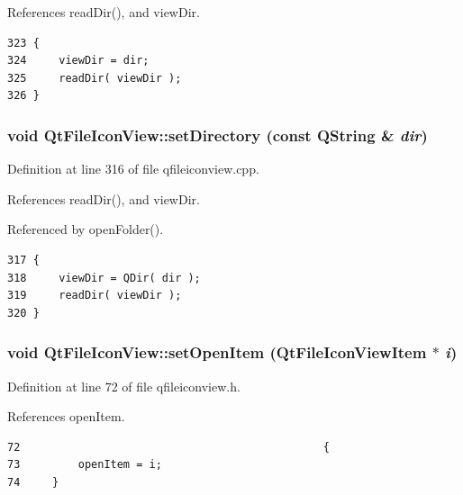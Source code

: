 References read\-Dir(), and view\-Dir.



\footnotesize\begin{verbatim}323 {
324     viewDir = dir;
325     readDir( viewDir );
326 }
\end{verbatim}\normalsize 
{}
\subsubsection{\setlength{\rightskip}{0pt plus 5cm}void Qt\-File\-Icon\-View::set\-Directory (const QString \& {\em dir})\hspace{0.3cm}{\tt  [slot]}}\label{classQtFileIconView_QtFileIconViewi0}




Definition at line 316 of file qfileiconview.cpp.

References read\-Dir(), and view\-Dir.

Referenced by open\-Folder().



\footnotesize\begin{verbatim}317 {
318     viewDir = QDir( dir );
319     readDir( viewDir );
320 }
\end{verbatim}\normalsize 
{}
\subsubsection{\setlength{\rightskip}{0pt plus 5cm}void Qt\-File\-Icon\-View::set\-Open\-Item ({\bf Qt\-File\-Icon\-View\-Item} $\ast$ {\em i})\hspace{0.3cm}{\tt  [inline]}}\label{classQtFileIconView_QtFileIconViewa3}




Definition at line 72 of file qfileiconview.h.

References open\-Item.



\footnotesize\begin{verbatim}72                                               {
73         openItem = i;
74     }
\end{verbatim}\normalsize 
{}
